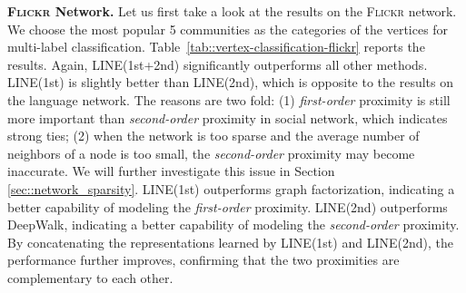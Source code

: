 \documentclass{sig-alternate-2013}
\begin{document}
\noindent \textbf{\textsc{Flickr} Network.}
Let us first take a look at the results on the \textsc{Flickr} network. We choose the most popular 5 communities as the categories of the vertices for multi-label classification. Table~\ref{tab::vertex-classification-flickr} reports the results. Again, LINE(1st+2nd) significantly outperforms all other methods. LINE(1st) is slightly better than LINE(2nd), which is opposite to the results on the language network. The reasons are two fold: (1) \emph{first-order} proximity is still more important than \emph{second-order} proximity in social network, which indicates strong ties; (2) when the network is too sparse and the average number of neighbors of a node is too small, the \emph{second-order} proximity may become inaccurate. We will further investigate this issue in Section \ref{sec::network_sparsity}.  LINE(1st) outperforms graph factorization, indicating a better capability of modeling the \emph{first-order} proximity. LINE(2nd) outperforms DeepWalk, indicating a better capability of modeling the \emph{second-order} proximity. By concatenating the representations learned by LINE(1st) and LINE(2nd), the performance further improves, confirming that the two proximities are complementary to each other.
\end{document}
